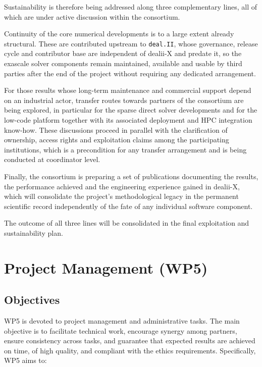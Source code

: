 \documentclass[a4paper,12pt, numbers]{article}
\newcommand{\dealii}{\texttt{deal.II}}
\begin{document}
Sustainability is therefore being addressed along three complementary lines, all of which
are under active discussion within the consortium.

Continuity of the core numerical developments is to a large extent already structural.
These are contributed upstream to \dealii{}, whose governance, release cycle and
contributor base are independent of dealii-X and predate it, so the exascale solver
components remain maintained, available and usable by third parties after the end of the
project without requiring any dedicated arrangement.

For those results whose long-term maintenance and commercial support depend on an
industrial actor, transfer routes towards partners of the consortium are being explored,
in particular for the sparse direct solver developments and for the low-code platform
together with its associated deployment and HPC integration know-how. These discussions
proceed in parallel with the clarification of ownership, access rights and exploitation
claims among the participating institutions, which is a precondition for any transfer
arrangement and is being conducted at coordinator level.

Finally, the consortium is preparing a set of publications documenting the results, the
performance achieved and the engineering experience gained in dealii-X, which will
consolidate the project's methodological legacy in the permanent scientific record
independently of the fate of any individual software component.

The outcome of all three lines will be consolidated in the final exploitation and
sustainability plan.

\newpage

\section{{Project Management (WP5)}}
\label{sec:wp5_management}

\subsection{Objectives}

WP5 is devoted to project management and administrative tasks. The main objective is to facilitate technical work, encourage synergy among partners, ensure consistency across tasks, and guarantee that expected results are achieved on time, of high quality, and compliant with the ethics requirements. Specifically, WP5 aims to:
\end{document}
